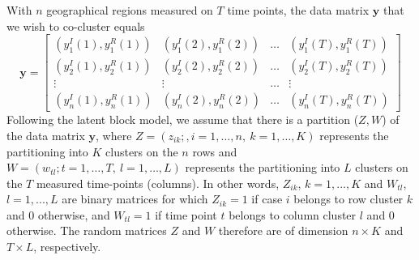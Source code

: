 \documentclass[10pt,a4paper]{article}
\begin{document}
With $n$ geographical regions measured on $T$ time points, the data matrix $\mathbf{y}$ that we wish to co-cluster equals
%
$$
\mathbf{y} = \begin{bmatrix}
	(y^I_1(1), y^R_1(1)) & (y^I_1(2), y^R_1(2)) & \ldots & (y^I_1(T), y^R_1(T))\\
	(y^I_2(1), y^R_2(1)) & (y^I_2(2), y^R_2(2)) & \ldots & (y^I_2(T), y^R_2(T))\\
	\vdots & \vdots & \ldots & \vdots \\
	(y^I_n(1), y^R_n(1)) & (y^I_n(2), y^R_n(2)) & \ldots & (y^I_n(T), y^R_n(T))
\end{bmatrix}
$$
%
Following the latent block model, we assume that there is a partition ($Z, W$) of the data matrix $\mathbf{y}$, where $Z = (z_{ik}; , i=1,\ldots, n, \: k = 1,\ldots, K)$ represents the partitioning into $K$ clusters on the $n$ rows and $W = (w_{tl}; t=1,\ldots, T, \: l=1,\ldots, L)$ represents the partitioning into $L$ clusters on the $T$ measured time-points (columns). In other words, $Z_{ik}$, $k = 1,..., K$ and $W_{tl}$, $l = 1,..., L$ are binary matrices for which $Z_{ik} = 1$ if case $i$ belongs to row cluster $k$ and $0$ otherwise, and $W_{tl} = 1$ if time point $t$ belongs to column cluster $l$ and $0$ otherwise. The random matrices $Z$ and $W$ therefore are of dimension $n \times K$ and $T \times L$, respectively. 
\end{document}
